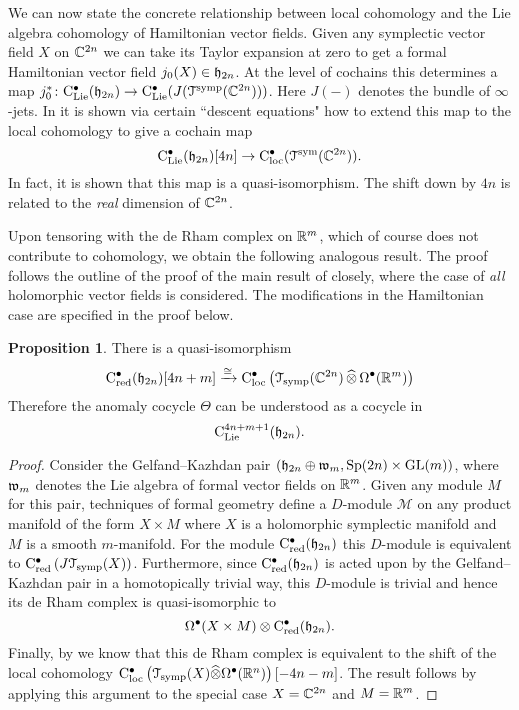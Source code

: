\documentclass[11pt, oneside, reqno]{amsart}
\theoremstyle{definition} \newtheorem{definition}{Definition}[section]
\newtheorem{prop}[definition]{Proposition}
\theoremstyle{definition}
\theoremstyle{remark}
\theoremstyle{definition} \newtheorem{remark}[definition]{Remark}
\theoremstyle{definition} \newtheorem{remarks}[definition]{Remarks}
\theoremstyle{definition} \newtheorem{question}[definition]{Question}
\theoremstyle{definition} \newtheorem*{note}{Note}
\theoremstyle{definition} \newtheorem{example}[definition]{Example}
\theoremstyle{definition} \newtheorem{examples}[definition]{Examples}
\def\clie{{\rm C}_{\rm Lie}}
\def\cloc{{\rm C}_{\rm loc}}
\def\bu{\bullet}
\def\Hat{\widehat}
\def\xto{\xrightarrow}
\def\cM{\mathcal M}\def\cN{\mathcal N}\def\cO{\mathcal O}\def\cP{\mathcal P}
\newcommand{\GL}{\mathrm{GL}}
\newcommand{\Sp}{\mathrm{Sp}}
\newcommand{\iso}{\cong}
\def\cred{{\rm C}_{\rm red}}
\begin{document}
We can now state the concrete relationship between local cohomology and the Lie algebra cohomology of Hamiltonian vector fields. 
Given any symplectic vector field $X$ on $\mathbb C^{2n}$ we can take its Taylor expansion at zero to get a formal Hamiltonian vector field $j_0 (X) \in \mathfrak h_{2n}$. 
At the level of cochains this determines a map $j_0^* \colon \clie^\bu(\fh_{2n}) \to \clie^\bu(J (\cT^{\rm symp}(\CC^{2n})))$. 
Here $J(-)$ denotes the bundle of $\infty$-jets.
In \cite{BWgf} it is shown via certain ``descent equations" how to extend this map to the local cohomology to give a cochain map
\[
\clie^\bu(\fh_{2n}) [4n] \to \cloc^\bu(\cT^{\rm sym}(\CC^{2n})) .
\]
In fact, it is shown that this map is a quasi-isomorphism. 
The shift down by $4n$ is related to the {\em real} dimension of $\mathbb C^{2n}$. 

Upon tensoring with the de Rham complex on $\mathbb R^{m}$, which of course does not contribute to cohomology, we obtain the following analogous result.
The proof follows the outline of the proof of the main result of\cite{BWgf} closely, where the case of {\em all} holomorphic vector fields is considered. The modifications in the Hamiltonian case are specified in the proof below.

\begin{prop} \label{ham_prop}
There is a quasi-isomorphism 
\[
\cred^\bu(\fh_{2n}) [4n +m] \xto{\iso} \cloc^\bu \left( \cT_{\rm symp}(\CC^{2n}) \, \Hat{\otimes}\,\Omega^\bu(\RR^m) \right)
\]
Therefore the anomaly cocycle $\Theta$ can be understood as a cocycle in 
\[
\clie^{4n+m+1}(\fh_{2n}) .
\]
\end{prop}
\begin{proof}
Consider the Gelfand--Kazhdan pair $\left(\fh_{2n} \oplus \fw_m , \Sp(2n) \times \GL(m) \right)$, where $\mathfrak w_m$ denotes the Lie algebra of formal vector fields on $\mathbb R^m$.  Given any module $M$ for this pair, techniques of formal geometry define a $D$-module $\cM$ on any product manifold of the form $X \times M$ where $X$ is a holomorphic symplectic manifold and $M$ is a smooth $m$-manifold. 
For the module $\cred^\bu(\fh_{2n})$ this $D$-module is equivalent to $\cred^\bu\left(J \cT_{\rm symp}(X)\right)$. 
Furthermore, since $\cred^\bu(\fh_{2n})$ is acted upon by the Gelfand--Kazhdan pair in a homotopically trivial way, this $D$-module is trivial and hence its de Rham complex is quasi-isomorphic to
\[
\Omega^{\bu} (X \times M) \otimes \cred^\bu(\fh_{2n}) .
\]
Finally, by \cite[Lemma 3.5.4.1]{Book2} we know that this de Rham complex is equivalent to the shift of the local cohomology $\cloc^\bu\left(\cT_{\rm symp}(X) \Hat{\otimes} \Omega^\bu(\RR^n) \right)[-4n-m]$. 
The result follows by applying this argument to the special case $X = \mathbb C^{2n}$ and $M = \mathbb R^m$.
\end{proof}
\end{document}
